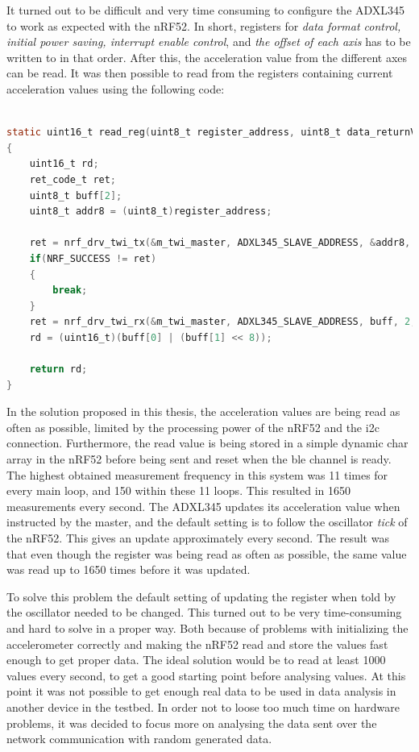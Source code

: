\noindent It turned out to be difficult and very time consuming to configure the \gls{ADXL345} to work as expected with the \gls{nRF52}. In short, registers for \textit{data format control, initial power saving, interrupt enable control}, and \textit{the offset of each axis} has to be written to in that order. After this, the acceleration value from the different axes can be read. It was then possible to read from the registers containing current acceleration values using the following code: 

\begin{lstlisting}[language=C]

static uint16_t read_reg(uint8_t register_address, uint8_t data_returnValue) 
{
	uint16_t rd;
	ret_code_t ret;
	uint8_t buff[2];
    uint8_t addr8 = (uint8_t)register_address;
    
    ret = nrf_drv_twi_tx(&m_twi_master, ADXL345_SLAVE_ADDRESS, &addr8, 1, true);
    if(NRF_SUCCESS != ret)
    {
        break;
    }
    ret = nrf_drv_twi_rx(&m_twi_master, ADXL345_SLAVE_ADDRESS, buff, 2, false);
	rd = (uint16_t)(buff[0] | (buff[1] << 8));
    
    return rd;	
}

\end{lstlisting}


\noindent In the solution proposed in this thesis, the acceleration values are being read as often as possible, limited by the processing power of the \gls{nRF52} and the \gls{i2c} connection. Furthermore, the read value is being stored in a simple dynamic char array in the \gls{nRF52} before being sent and reset when the \gls{ble} channel is ready. The highest obtained measurement frequency in this system was 11 times for every main loop, and 150 within these 11 loops. This resulted in 1650 measurements every second. The \gls{ADXL345} updates its acceleration value when instructed by the master, and the default setting is to follow the oscillator \textit{tick} of the \gls{nRF52}. This gives an update approximately every second. The result was that even though the register was being read as often as possible, the same value was read up to 1650 times before it was updated. 



\noindent To solve this problem the default setting of updating the register when told by the oscillator needed to be changed. This turned out to be very time-consuming and hard to solve in a proper way. Both because of problems with initializing the accelerometer correctly and making the \gls{nRF52} read and store the values fast enough to get proper data. The ideal solution would be to read at least 1000 values every second, to get a good starting point before analysing values. At this point it was not possible to get enough real data to be used in data analysis in another device in the testbed. In order not to loose too much time on hardware problems, it was decided to focus more on analysing the data sent over the network communication with random generated data. 


